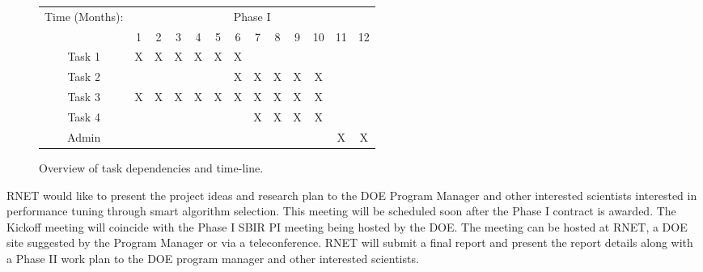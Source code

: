 \begin{figure}
\centering
\begin{tabular}{|c|c|c|c|c|c|c|c|c|c|c|c|c|}
   \hline 
   \multirow{2}{*}{ Time (Months): } & \multicolumn{12}{|c|}{ Phase I } \\
   \cline{2-12} 
   & 1 & 2 & 3 & 4 & 5 & 6 & 7 &8 & 9 & 10 & 11 & 12 \\
   \hline 
   Task 1 & X & X & X  & X &  X & X & & & & & &  \\
   \hline
   Task 2 & & & & & & X& X & X & X &X & &   \\
  \hline
   Task 3 &X &X &X & X & X & X & X & X & X & X & &\\
  \hline
   Task 4 & & & &  &  &  & X & X & X & X & & \\
  \hline
   Admin & & & &  &  &  &  & & &  & X & X\\
  \hline

\end{tabular}
\caption{Overview of task dependencies and time-line.}
\label{fig:tasks}
\end{figure}


RNET would like to present the project ideas and research plan to the DOE 
Program Manager and other interested scientists interested in performance tuning
through smart algorithm selection. This meeting will 
be scheduled soon after the Phase I contract is awarded. The Kickoff meeting 
will coincide with the Phase I SBIR PI meeting being hosted by the DOE. The 
meeting can be hosted at RNET, a DOE site suggested by the Program Manager or 
via a teleconference. RNET will submit a final report and present the report 
details along with a Phase II work plan to the DOE program manager and other 
interested scientists.

%

